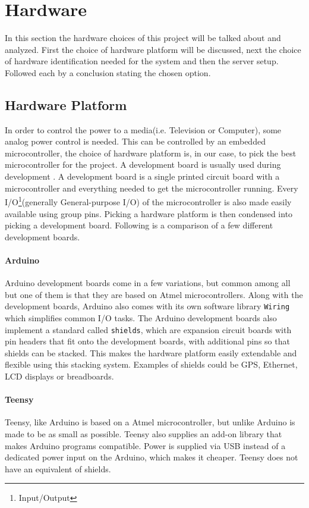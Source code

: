 \chapter{Hardware}
\label{chap:hardware}
In this section the hardware choices of this project will be talked about and analyzed. First the choice of hardware platform will be discussed, next the choice of hardware identification needed for the system and then the server setup. Followed each by a conclusion stating the chosen option.

\section{Hardware Platform}
\label{HardwarePlatform}
In order to control the power to a media(i.e. Television or Computer), some analog power control is needed. This can be controlled by an embedded microcontroller, the choice of hardware platform is, in our case, to pick the best microcontroller for the project. A development board is usually used during development . A development board is a single printed circuit board with a microcontroller and everything needed to get the microcontroller running. Every I/O\footnote{Input/Output}(generally General-purpose I/O) of the microcontroller is also made easily available using group pins. Picking a hardware platform is then condensed into picking a development board. Following is a comparison of a few different development boards.

\subsubsection{Arduino}
Arduino development boards come in a few variations, but common among all but one of them is that they are based on Atmel microcontrollers. Along with the development boards, Arduino also comes with its own software library \texttt{Wiring} which simplifies common I/O tasks. The Arduino development boards also implement a standard called \texttt{shields}, which are expansion circuit boards with pin headers that fit onto the development boards, with additional pins so that shields can be stacked. This makes the hardware platform easily extendable and flexible using this stacking system. Examples of shields could be GPS, Ethernet, LCD displays or breadboards.\citep{arduinoCC}


\subsubsection{Teensy}
Teensy, like Arduino is based on a Atmel microcontroller, but unlike Arduino is made to be as small as possible. Teensy also supplies an add-on library that makes Arduino programs compatible. Power is supplied via USB instead of a dedicated power input on the Arduino, which makes it cheaper. Teensy does not have an equivalent of shields.\citep{teensyPJRC}


